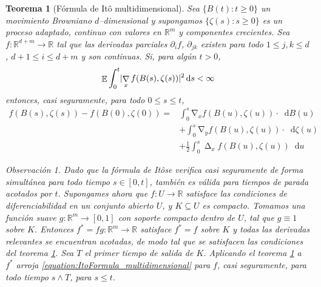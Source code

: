 \documentclass{report}
\newcommand{\ito}{Itô}
\newcommand{\brownian}{B}
\newcommand{\dd}{\mathop{}\!\mathrm{d}}
\newcommand{\realNumbers}{\mathbb{R}}
\DeclareMathOperator{\laplacian}{\Delta}
\DeclareMathOperator{\grad}{\nabla}
\DeclareMathOperator{\Expectation}{\mathbb{E}}
\DeclarePairedDelimiter{\abs}{\lvert}{\rvert}
\theoremstyle{plain}
\newtheorem{theorem}{Teorema}
\theoremstyle{remark}
\newtheorem{remark}{Observación}
\theoremstyle{definition}
\begin{document}
\begin{theorem}[Fórmula de \ito{} multidimensional]
  \label{theorem:ItoFormula_multidimensional}
  Sea \(\{\brownian(t) : t \geq 0\}\) un movimiento Browniano \(d\)--dimensional y supongamos \(\{\zeta(s) : s \geq 0\}\) es un proceso adaptado, continuo con valores en \(\realNumbers^m\) y componentes crecientes.
  Sea \(f : \realNumbers^{d + m} \rightarrow \realNumbers\) tal que las derivadas parciales \(\partial_i f\), \(\partial_{j k}\) existen para todo \(1 \leq j, k \leq d\), \(d + 1 \leq i \leq d + m\) y son continuas.
  Si, para algún \(t > 0\),
  \begin{align}
    \Expectation \int_0^t \abs{\grad_x f(\brownian(s), \zeta(s))}^2 \dd s
    <
    \infty
  \end{align}
  entonces, casi seguramente, para todo \(0 \leq s \leq t\),
  \begin{align}
    f(\brownian(s), \zeta(s)) - f(\brownian(0), \zeta(0))
    =
    &\int_0^s \grad_x f(\brownian(u), \zeta(u)) \cdot \dd \brownian(u)
    \nonumber
    \\
    &+ \int_0^s \grad_y f(\brownian(u), \zeta(u)) \cdot \dd \zeta(u)
    \nonumber
    \\
    &+ \frac{1}{2} \int_0^s \laplacian_x f(\brownian(u), \zeta(u)) \dd u
    \label{equation:ItoFormula_multidimensional}
  \end{align}
  \begin{remark}
    Dado que la fórmula de \ito se verifica casi seguramente de forma simultánea para todo tiempo \(s \in [0, t]\), también es válida para tiempos de parada acotados por \(t\).
    Supongames ahora que \(f : U \rightarrow \realNumbers\) satisface las condiciones de diferenciabilidad en un conjunto abierto \(U\), y \(K \subseteq U\) es compacto.
    Tomamos una función suave \(g : \realNumbers^m \rightarrow [0, 1]\) con soporte compacto dentro de \(U\), tal que \(g \equiv 1\) sobre \(K\).
    Entonces \(f^* = f g : \realNumbers^m \rightarrow \realNumbers\) satisface \(f^* = f\) sobre \(K\) y todas las derivadas relevantes se encuentran acotadas, de modo tal que se satisfacen las condiciones del teorema \ref{theorem:ItoFormula_multidimensional}.
    Sea \(T\) el primer tiempo de salida de \(K\).
    Aplicando el teorema \ref{theorem:ItoFormula_multidimensional} a \(f^*\) arroja \eqref{equation:ItoFormula_multidimensional} para \(f\), casi seguramente, para todo tiempo \(s \wedge T\), para \(s \leq t\).
  \end{remark}
\end{theorem}

\end{document}

